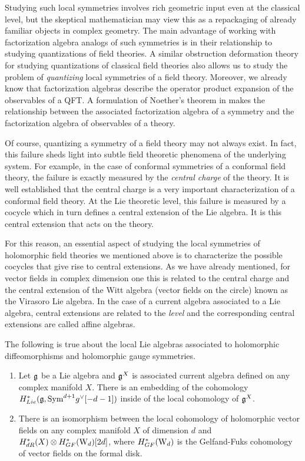\documentclass[10pt]{amsart}
\begin{document}
Studying such local symmetries involves rich geometric input even at the classical level, but the skeptical mathematician may view this as a repackaging of already familiar objects in complex geometry.
The main advantage of working with factorization algebra analogs of such symmetries is in their relationship to studying quantizations of field theories.
A similar obstruction deformation theory for studying quantizations of classical field theories also allows us to study the problem of {\em quantizing} local symmetries of a field theory.
Moreover, we already know that factorization algebras describe the operator product expansion of the observables of a QFT.
A formulation of Noether's theorem in \cite{CG} makes the relationship between the associated factorization algebra of a symmetry and the factorization algebra of observables of a theory.

Of course, quantizing a symmetry of a field theory may not always exist.
In fact, this failure sheds light into subtle field theoretic phenomena of the underlying system. 
For example, in the case of conformal symmetries of a conformal field theory, the failure is exactly measured by the {\em central charge} of the theory. 
It is well established that the central charge is a very important characterization of a conformal field theory.
At the Lie theoretic level, this failure is measured by a cocycle which in turn defines a central extension of the Lie algebra. 
It is this central extension that acts on the theory. 

For this reason, an essential aspect of studying the local symmetries of holomorphic field theories we mentioned above is to characterize the possible cocycles that give rise to central extensions. 
As we have already mentioned, for vector fields in complex dimension one this is related to the central charge and the central extension of the Witt algebra (vector fields on the circle) known as the Virasoro Lie algebra.
In the case of a current algebra associated to a Lie algebra, central extensions are related to the {\em level} and the corresponding central extensions are called affine algebras. 

\begin{thm}\label{thm: chap3 1}
The following is true about the local Lie algebras associated to holomorphic diffeomorphisms and holomorphic gauge symmetries.
\begin{enumerate}
\item Let $\mathfrak g$ be a Lie algebra and $\mathfrak g^X$ is associated current algebra defined on any complex manifold $X$. 
There is an embedding of the cohomology $H^*_{Lie}(\mathfrak g , {\rm Sym}^{d+1} g^\vee [-d-1])$ inside of the local cohomology of $\mathfrak g^X$.
\item There is an isomorphism between the local cohomology of holomorphic vector fields on any complex manifold $X$ of dimension $d$ and $H_{dR}^*(X) \otimes H^*_{GF}({\rm W}_d)[2d]$, where  $H^*_{GF}({\rm W}_d)$ is the Gelfand-Fuks cohomology of vector fields on the formal disk.
\end{enumerate}
\end{thm}
\end{document}
